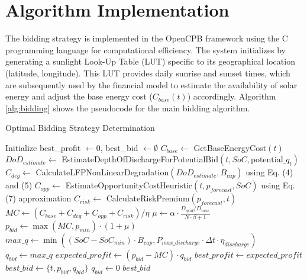 \documentclass[11pt,a4paper]{article}
\begin{document}
\section{Algorithm Implementation} \label{sec:AlgorithmImplementation}
The bidding strategy is implemented in the OpenCPB framework using the C programming language for computational efficiency. The system initializes by generating a sunlight Look-Up Table (LUT) specific to its geographical location (latitude, longitude). This LUT provides daily sunrise and sunset times, which are subsequently used by the financial model to estimate the availability of solar energy and adjust the base energy cost ($C_{base}(t)$) accordingly. Algorithm \ref{alg:bidding} shows the pseudocode for the main bidding algorithm.

\begin{algorithm}
\caption{Optimal Bidding Strategy Determination}
\label{alg:bidding}
\begin{algorithmic}[1]
\State Initialize best\_profit $\gets 0$, best\_bid $\gets \emptyset$
    \State $C_{base} \gets$ GetBaseEnergyCost$(t)$ 
    \State $DoD_{estimate} \gets$ EstimateDepthOfDischargeForPotentialBid$(t, SoC, \text{potential\_}q_t)$
    \State $C_{deg} \gets$ CalculateLFPNonLinearDegradation$(DoD_{estimate}, B_{cap})$ using Eq. (4) and (5)
    \State $C_{opp} \gets$ EstimateOpportunityCostHeuristic$(t, p_{forecast}, SoC)$ using Eq. (7) approximation
    \State $C_{risk} \gets$ CalculateRiskPremium$(p_{forecast}, t)$
    \State $MC \gets (C_{base} + C_{deg} + C_{opp} + C_{risk}) / \eta$ 
    \State $\mu \gets \alpha \cdot \frac{D_{grid}/D_{max}}{N \cdot \beta + 1}$ 
    \State $p_{bid} \gets \max(MC, p_{min}) \cdot (1 + \mu)$ 
    \State $max\_q \gets \min((SoC - SoC_{min}) \cdot B_{cap}, P_{max\_discharge} \cdot \Delta t \cdot \eta_{discharge})$ 
        \State $q_{bid} \gets max\_q$ 
        \State $expected\_profit \gets (p_{bid} - MC) \cdot q_{bid}$
            \State $best\_profit \gets expected\_profit$
            \State $best\_bid \gets \{t, p_{bid}, q_{bid}\}$
        \EndIf
    \Else
        \State $q_{bid} \gets 0$ 
    \EndIf
\EndFor
\State \Return $best\_bid$
\EndProcedure
\end{algorithmic}
\end{algorithm}
\end{document}
